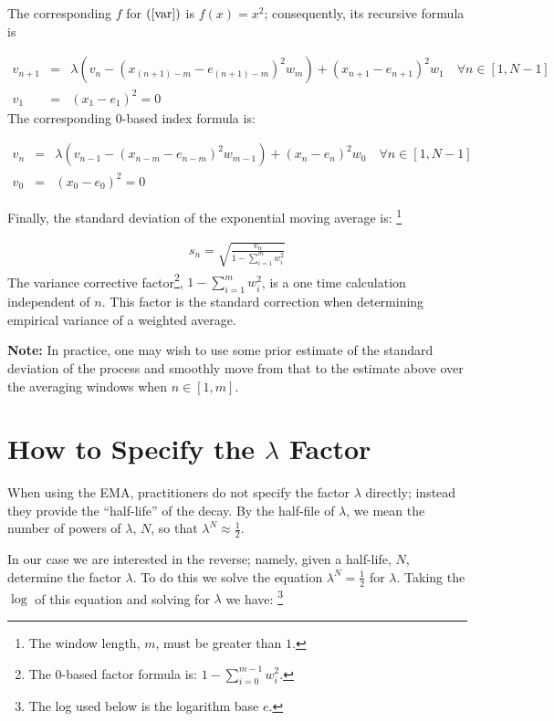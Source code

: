 \documentclass{article}
\begin{document}
The corresponding $f$ for $(\ref{var})$ is $f(x) = x^2$; 
consequently, its recursive formula is 

\begin{eqnarray}
    v_{n+1} & = & \lambda \left( v_n -  ( x_{(n+1)-m} - e_{(n+1)-m} )^2 w_m \right) + ( x_{n+1} - e_{n+1} )^2 w_1 \quad \forall n \in [1, N-1] \\
    v_1  & = & (x_1 - e_1)^2 = 0
\end{eqnarray}
The corresponding 0-based index formula is:

\begin{eqnarray}
    v_{n} & = & \lambda \left( v_{n-1} - ( x_{n-m} - e_{n-m} )^2 w_{m-1}\right) + ( x_{n} - e_{n} )^2 w_0 \quad \forall n \in [1, N-1] \\
    v_0  & = & (x_0 - e_0)^2 = 0
\end{eqnarray}

Finally, the standard deviation of the exponential moving average is:%
\footnote{The window length, $m$, must be greater than $1$.}

\begin{eqnarray}
    s_{n} = \sqrt{\frac{v_n}{1 - \sum_{i=1}^m w_i^2}} 
\end{eqnarray}
The variance corrective factor\footnote{The 0-based factor formula is: $1 - \sum_{i=0}^{m-1} w_i^2$.}, $1 - \sum_{i=1}^m w_i^2$,
is a one time calculation independent of $n$. This factor is the standard 
correction when determining empirical variance of a weighted average.

{\bf Note:\/} In practice, one may wish to use some prior estimate of the standard deviation of the process
and smoothly move from that to the estimate above over the averaging windows when $n \in [1, m]$.


\section{How to Specify the $\lambda$ Factor}
When using the EMA, practitioners do not specify the factor $\lambda$ directly; 
instead they provide the ``half-life'' of the decay.
By the half-file of $\lambda$, we mean the number of powers of $\lambda$, $N$, so that
$\lambda^N \approx \frac{1}{2}$. 

In our case we are interested in the reverse; namely, given a half-life, $N$, 
determine the factor $\lambda$. To do this we solve the equation $\lambda^N = \frac{1}{2}$
for $\lambda$.
Taking the $\log$ of this equation and solving for $\lambda$ we have:%
\footnote{The log used below is the logarithm base $e$.}
\end{document}
